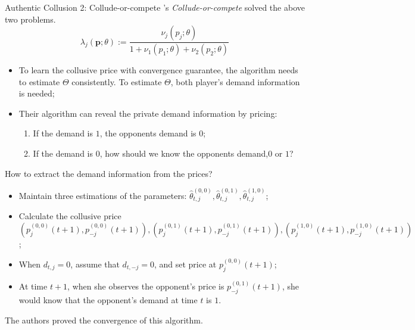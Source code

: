 \documentclass[8pt]{beamer}
\begin{document}
\begin{frame}{Authentic Collusion 2: Collude-or-compete}
   \cite{loots2023data}'s \textit{Collude-or-compete} solved the above two problems.
   \[\lambda_j(\mathbf{p};\theta):=\frac{\nu_j(p_j;\theta)}{1+\nu_1(p_1;\theta)+\nu_2(p_2;\theta)}\]
   \begin{itemize}
       \item To learn the collusive price with convergence guarantee, the algorithm needs to estimate $\Theta$ consistently.
       \itme To estimate $\Theta$, both player's demand information is needed;
       \item Their algorithm can reveal the private demand information by pricing:
        \begin{enumerate}
            \item If the demand is $1$, the opponents demand is $0$;
            \item If the demand is $0$, how should we know the opponents demand,$0$ or $1$?
        \end{enumerate}
   \end{itemize}
   How to extract the demand information from the prices?
   \begin{itemize}
       \item Maintain three estimations of the parameters: $\hat{\theta}_{t,j}^{(0,0)}, \hat{\theta}_{t,j}^{(0,1)}, \hat{\theta}_{t,j}^{(1,0)}$;
       \item Calculate the collusive price $(p_{j}^{(0,0)}(t+1),p_{-j}^{(0,0)}(t+1)), (p_{j}^{(0,1)}(t+1),p_{-j}^{(0,1)}(t+1)), (p_{j}^{(1,0)}(t+1),p_{-j}^{(1,0)}(t+1))$;
       \item When $d_{t,j}=0$, assume that $d_{t,-j}=0$, and set price at $p_{j}^{(0,0)}(t+1)$;
       \item At time $t+1$, when she observes the opponent's price is $p_{-j}^{(0,1)}(t+1)$, she would know that the opponent's demand at time $t$ is $1$. 
   \end{itemize}
   The authors proved the convergence of this algorithm.
\end{frame}
\end{document}
